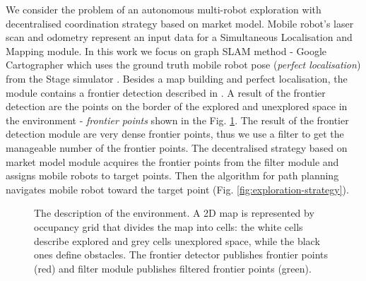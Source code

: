 \documentclass[letterpaper, 10 pt, conference]{ieeeconf}  %
\begin{document}
We consider the problem of an autonomous multi-robot exploration with decentralised coordination strategy based on market model. Mobile robot's laser scan and odometry represent an input data for a Simultaneous Localisation and Mapping module. In this work we focus on graph SLAM method - Google Cartographer \cite{cartographer} which uses the ground truth mobile robot pose (\textit {perfect localisation}) from the Stage simulator \cite{Stage}. Besides a map building and perfect localisation, the module contains a frontier detection described in \cite{juraj}. A result of the frontier detection are the points on the border of the explored and unexplored space in the environment - \textit{frontier points} shown in the Fig. \ref{fig:environment}. The result of the frontier detection module are very dense frontier points, thus we use a filter to get the manageable number of the frontier points. The decentralised strategy based on market model module acquires the frontier points from the filter module and assigns mobile robots to target points. Then the algorithm for path planning navigates mobile robot toward the target point (Fig. \ref{fig:exploration-strategy}).      

\begin{figure}{}
    \centering
	\caption {The description of the environment. A 2D map is represented by occupancy grid that divides the map into cells: the white cells describe explored and grey cells unexplored space, while the black ones define obstacles. The frontier detector publishes frontier points (red) and filter module publishes filtered frontier points (green).}
	\label{fig:environment}
\end{figure}
\end{document}
